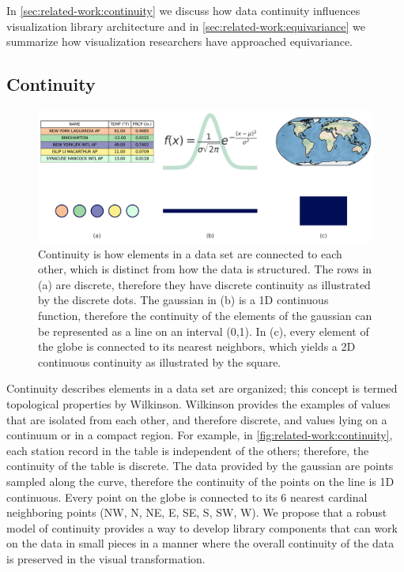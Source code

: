 \documentclass[10pt,journal,compsoc]{IEEEtran}
\theoremstyle{definition}
\theoremstyle{remark}
\begin{document}
In \autoref{sec:related-work:continuity} we discuss how data continuity influences visualization library architecture and in \autoref{sec:related-work:equivariance} we summarize how visualization researchers have approached equivariance. 

\subsection{Continuity}
\label{sec:related-work:continuity}
\begin{figure}[h!]
  \includegraphics[width=\columnwidth]{k_different_types.png}
  \caption{Continuity is how elements in a data set are connected to each other, which is distinct from how the data is structured. The rows in (a) are discrete, therefore they have discrete continuity as illustrated by the discrete dots. The gaussian in (b) is a 1D continuous function, therefore the continuity of the elements of the gaussian can be represented as a line on an interval (0,1). In (c), every element of the globe is connected to its nearest neighbors, which yields a 2D continuous continuity as illustrated by the square.}
  \label{fig:related-work:continuity}
\end{figure}
Continuity describes elements in a data set are organized; this concept is termed topological properties by Wilkinson\cite{wilkinsonGrammarGraphics2005}. Wilkinson provides the examples of values that are isolated from each other, and therefore discrete, and values lying on a continuum or in a compact region. For example, in \autoref{fig:related-work:continuity}, each station record in the table is independent of the others; therefore, the continuity of the table is discrete. The data provided by the gaussian are points sampled along the curve, therefore the continuity of the points on the line is 1D continuous. Every point on the globe is connected to its 6 nearest cardinal neighboring points (NW, N, NE, E, SE, S, SW, W). We propose that a robust model of continuity provides a way to develop library components that can work on the data in small pieces in a manner where the overall continuity of the data is preserved in the visual transformation. 
\end{document}
